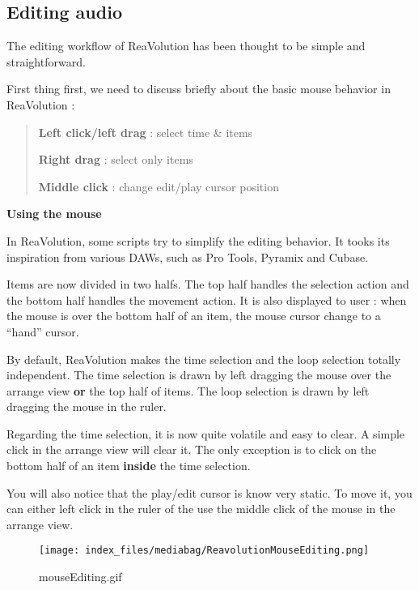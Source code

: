 \documentclass[
  letterpaper,
  DIV=11,
  numbers=noendperiod]{scrreport}
\begin{document}
\hypertarget{editing-audio}{%
\subsection{Editing audio}\label{editing-audio}}

The editing workflow of ReaVolution has been thought to be simple and
straightforward.

First thing first, we need to discuss briefly about the basic mouse
behavior in ReaVolution :

\begin{quote}
\textbf{Left click/left drag} : select time \& items

\textbf{Right drag} : select only items

\textbf{Middle click} : change edit/play cursor position
\end{quote}

\textbf{Using the mouse}

In ReaVolution, some scripts try to simplify the editing behavior. It
tooks its inspiration from various DAWs, such as Pro Tools, Pyramix and
Cubase.

Items are now divided in two halfs. The top half handles the selection
action and the bottom half handles the movement action. It is also
displayed to user : when the mouse is over the bottom half of an item,
the mouse cursor change to a ``hand'' cursor.

By default, ReaVolution makes the time selection and the loop selection
totally independent. The time selection is drawn by left dragging the
mouse over the arrange view \textbf{or} the top half of items. The loop
selection is drawn by left dragging the mouse in the ruler.

Regarding the time selection, it is now quite volatile and easy to
clear. A simple click in the arrange view will clear it. The only
exception is to click on the bottom half of an item \textbf{inside} the
time selection.

You will also notice that the play/edit cursor is know very static. To
move it, you can either left click in the ruler of the use the middle
click of the mouse in the arrange view.

\begin{figure}

{\centering \texttt{[image: index\_files/mediabag/ReavolutionMouseEditing.png]}

}

\caption{mouseEditing.gif}

\end{figure}
\end{document}
